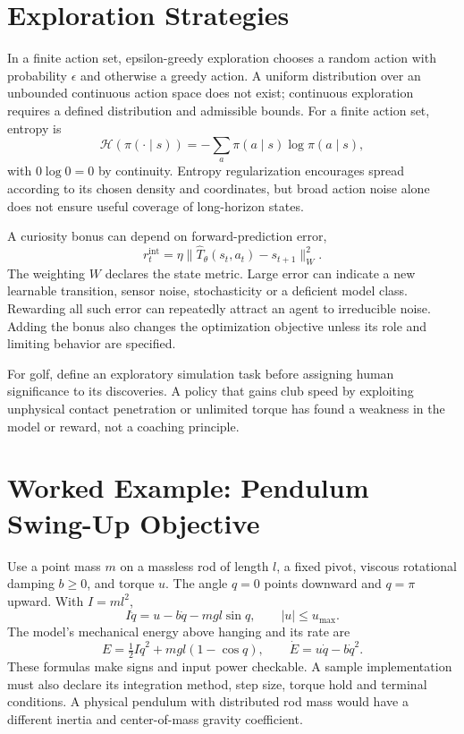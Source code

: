 \section{Exploration Strategies}
\label{sec:exploration_strategies}

In a finite action set, epsilon-greedy exploration chooses a random action with probability $\epsilon$ and otherwise a greedy action. A uniform distribution over an unbounded continuous action space does not exist; continuous exploration requires a defined distribution and admissible bounds. For a finite action set, entropy is
\begin{equation}
\mathcal H(\pi(\cdot\mid s))=-\sum_a\pi(a\mid s)\log\pi(a\mid s),
\label{eq:entropy_exploration}
\end{equation}
with $0\log0=0$ by continuity. Entropy regularization encourages spread according to its chosen density and coordinates, but broad action noise alone does not ensure useful coverage of long-horizon states.

A curiosity bonus can depend on forward-prediction error,
\begin{equation}
r_t^{\mathrm{int}}=\eta\|\hat T_\theta(s_t,a_t)-s_{t+1}\|_W^2.
\label{eq:curiosity_reward}
\end{equation}
The weighting $W$ declares the state metric. Large error can indicate a new learnable transition, sensor noise, stochasticity or a deficient model class. Rewarding all such error can repeatedly attract an agent to irreducible noise. Adding the bonus also changes the optimization objective unless its role and limiting behavior are specified.

For golf, define an exploratory simulation task before assigning human significance to its discoveries. A policy that gains club speed by exploiting unphysical contact penetration or unlimited torque has found a weakness in the model or reward, not a coaching principle.

\section{Worked Example: Pendulum Swing-Up Objective}

Use a point mass $m$ on a massless rod of length $l$, a fixed pivot, viscous rotational damping $b\ge0$, and torque $u$. The angle $q=0$ points downward and $q=\pi$ upward. With $I=ml^2$,
\begin{equation}
I\ddot q=u-b\dot q-mgl\sin q,\qquad |u|\le u_{\max}.
\end{equation}
The model's mechanical energy above hanging and its rate are
\begin{equation}
E=\tfrac12 I\dot q^2+mgl(1-\cos q),\qquad
\dot E=u\dot q-b\dot q^2.
\end{equation}
These formulas make signs and input power checkable. A sample implementation must also declare its integration method, step size, torque hold and terminal conditions. A physical pendulum with distributed rod mass would have a different inertia and center-of-mass gravity coefficient.

